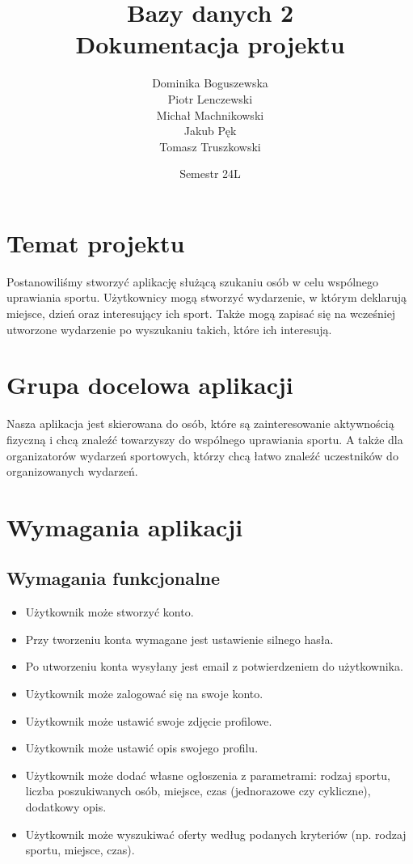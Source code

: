 \documentclass[11pt,a4paper]{article}
\title{Bazy danych 2 \\
Dokumentacja projektu}
\author{Dominika Boguszewska \\
Piotr Lenczewski \\
Michał Machnikowski \\
Jakub Pęk \\
Tomasz Truszkowski}
\date{Semestr 24L}
\begin{document}
\maketitle

\tableofcontents

\newpage

\section{Temat projektu}

Postanowiliśmy stworzyć aplikację służącą szukaniu osób w celu wspólnego uprawiania sportu. Użytkownicy mogą stworzyć wydarzenie, w którym deklarują miejsce, dzień oraz interesujący ich sport. Także mogą zapisać się na wcześniej utworzone wydarzenie po wyszukaniu takich, które ich interesują.

\section{Grupa docelowa aplikacji}

Nasza aplikacja jest skierowana do osób, które są zainteresowanie aktywnością fizyczną i chcą znaleźć towarzyszy do wspólnego uprawiania sportu. A także dla organizatorów wydarzeń sportowych, którzy chcą łatwo znaleźć uczestników do organizowanych wydarzeń.

\section{Wymagania aplikacji}

\subsection{Wymagania funkcjonalne}

\begin{itemize}
    \item Użytkownik może stworzyć konto.
    \item Przy tworzeniu konta wymagane jest ustawienie silnego hasła.
    \item Po utworzeniu konta wysyłany jest email z potwierdzeniem do użytkownika.
    \item Użytkownik może zalogować się na swoje konto.
    \item Użytkownik może ustawić swoje zdjęcie profilowe.
    \item Użytkownik może ustawić opis swojego profilu.
    \item Użytkownik może dodać własne ogłoszenia z parametrami: rodzaj sportu, liczba poszukiwanych osób, miejsce, czas (jednorazowe czy cykliczne), dodatkowy opis.
    \item Użytkownik może wyszukiwać oferty według podanych kryteriów (np. rodzaj sportu, miejsce, czas).
\end{itemize}
 
\end{document}
